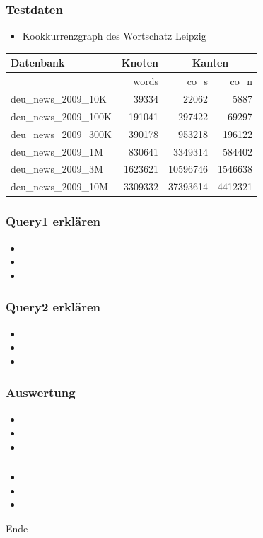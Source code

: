 \documentclass{beamer}
\begin{document}
\begin{frame}\frametitle{Testdaten}
	\begin{itemize}
		\item Kookkurrenzgraph des Wortschatz Leipzig
	\end{itemize} 
	\begin{tabular}{|l|r|r|r|}
		\hline
		Datenbank & Knoten & \multicolumn{2}{|c|}{Kanten}\\
		\hline
		 & words & co\_{}s & co\_{}n \\
		\hline
		\hline
		deu\_{}news\_{}2009\_{}10K & 39334 & 22062 & 5887\\
		\hline
		deu\_{}news\_{}2009\_{}100K & 191041 & 297422 & 69297\\
		\hline
		deu\_{}news\_{}2009\_{}300K & 390178 & 953218 & 196122\\
		\hline
		deu\_{}news\_{}2009\_{}1M & 830641 & 3349314 & 584402\\
		\hline
		deu\_{}news\_{}2009\_{}3M & 1623621 & 10596746 & 1546638\\
		\hline
		deu\_{}news\_{}2009\_{}10M & 3309332 & 37393614 & 4412321\\
		\hline
	\end{tabular}
\end{frame}

\begin{frame}\frametitle{Query1 erklären} 
	\begin{itemize}
		\item 
		\item 
		\item 
	\end{itemize} 
\end{frame}

\begin{frame}\frametitle{Query2 erklären}
	\begin{itemize}
		\item 
		\item 
		\item 
	\end{itemize} 
\end{frame}

\begin{frame}\frametitle{Auswertung} 
	\begin{itemize}
		\item 
		\item 
		\item 
	\end{itemize} 
\end{frame}

\begin{frame}\frametitle{} 
	\begin{itemize}
		\item 
		\item 
		\item 
	\end{itemize} 
\end{frame}

\begin{frame}
	\begin{center}
		\begin{Huge}
			Ende
		\end{Huge}
	\end{center}
\end{frame}
\end{document}
